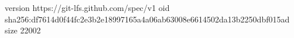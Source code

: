 version https://git-lfs.github.com/spec/v1
oid sha256:df7614d0f44fc2e3b2e18997165a4a06ab63008e6614502da13b2250dbf015ad
size 22002
